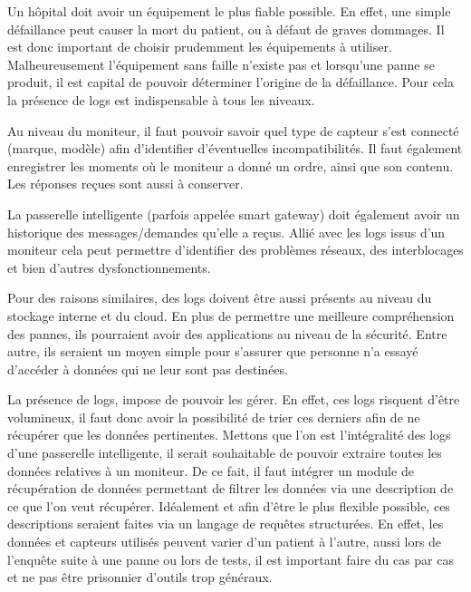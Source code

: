 Un hôpital doit avoir un équipement le plus fiable possible. En effet, une simple défaillance peut causer la mort du patient, ou
à défaut de graves dommages. Il est donc important de choisir prudemment les équipements à utiliser. Malheureusement l'équipement
sans faille n'existe pas et lorsqu'une panne se produit, il est capital de pouvoir déterminer l'origine de la défaillance. Pour
cela la présence de logs est indispensable à tous les niveaux. 
\newline

Au niveau du moniteur, il faut pouvoir savoir quel type de capteur s'est connecté (marque, modèle) afin d'identifier d'éventuelles
incompatibilités. Il faut également enregistrer les moments où le moniteur a donné un ordre, ainsi que son contenu.
Les réponses reçues sont aussi à conserver.
\newline

La passerelle intelligente (parfois appelée smart gateway) doit également avoir un historique des messages/demandes qu'elle a
reçus. Allié avec les logs issus d'un moniteur cela peut permettre d'identifier des problèmes réseaux, des interblocages et bien
d'autres dysfonctionnements.
\newline 

Pour des raisons similaires, des logs doivent être aussi présents au niveau du stockage interne et du cloud. En plus de permettre
une meilleure compréhension des pannes, ils pourraient avoir des applications au niveau de la sécurité. Entre autre, ils seraient
un moyen simple pour s'assurer que personne n'a essayé d'accéder à données qui ne leur sont pas destinées.
\newline

La présence de logs, impose de pouvoir les gérer. En effet, ces logs risquent d'être volumineux, il faut donc avoir la
possibilité de trier ces derniers afin de ne récupérer que les données pertinentes. Mettons que l'on est l'intégralité des logs
d'une passerelle intelligente, il serait souhaitable de pouvoir extraire toutes les données relatives à un moniteur. De ce fait,
il faut intégrer un module de récupération de données permettant de filtrer les données via une description de ce que l'on veut
récupérer. Idéalement et afin d'être le plus flexible possible, ces descriptions seraient faites via un langage de requêtes
structurées. En effet, les données et capteurs utilisés peuvent varier d'un patient à l'autre, aussi lors de l'enquête suite à une
panne ou lors de tests, il est important faire du cas par cas et ne pas être prisonnier d'outils trop généraux.
\newline


